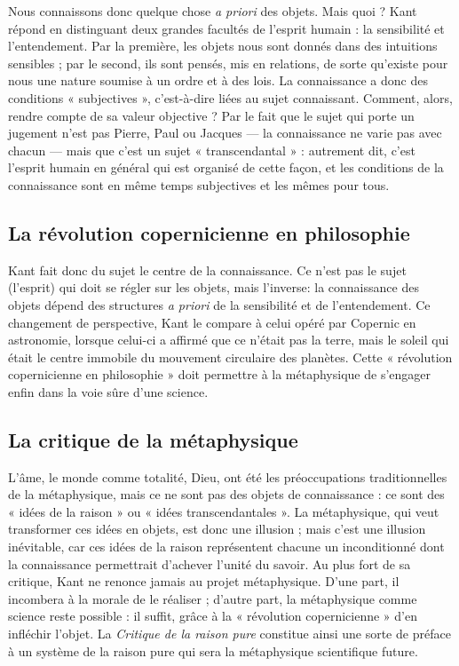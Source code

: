 Nous connaissons donc quelque chose
{\it a priori} des objets. Mais quoi ? Kant
répond en distinguant deux grandes
facultés de l'esprit humain : la sensibilité
et l’entendement. Par la première,
les objets nous sont donnés dans des
intuitions sensibles ; par le second, ils
sont pensés, mis en relations, de sorte
qu’existe pour nous une nature soumise
à un ordre et à des lois. La connaissance
a donc des conditions « subjectives »,
c'est-à-dire liées au sujet connaissant.
Comment, alors, rendre compte de sa
valeur objective ? Par le fait que le sujet
qui porte un jugement n’est pas Pierre,
Paul ou Jacques — la connaissance ne
varie pas avec chacun — mais que c’est
un sujet « transcendantal » : autrement
dit, c’est l'esprit humain en général qui
est organisé de cette façon, et les conditions
de la connaissance sont en même
temps subjectives et les mêmes pour
tous.

\subsection{La révolution copernicienne en philosophie}

Kant fait donc du sujet le centre de la
connaissance. Ce n'est pas le sujet
(l'esprit) qui doit se régler sur les objets,
mais l'inverse: la connaissance des
objets dépend des structures {\it a priori} de
la sensibilité et de l’entendement. Ce
changement de perspective, Kant le
compare à celui opéré par Copernic en
astronomie, lorsque celui-ci a affirmé
que ce n'était pas la terre, mais le soleil
qui était le centre immobile du mouvement
circulaire des planètes. Cette
« révolution copernicienne en philosophie »
doit permettre à la métaphysique
de s'engager enfin dans la voie sûre
d’une science.

\subsection{La critique de la métaphysique}

L'âme, le monde comme totalité, Dieu,
ont été les préoccupations traditionnelles
de la métaphysique, mais ce ne
sont pas des objets de connaissance : ce
sont des « idées de la raison » ou « idées
transcendantales ». La métaphysique,
qui veut transformer ces idées en objets,
est donc une illusion ; mais c’est une
illusion inévitable, car ces idées de la raison
représentent chacune un
inconditionné dont la connaissance
permettrait d'achever l'unité du savoir.
Au plus fort de sa critique, Kant ne
renonce jamais au projet métaphysique.
D'une part, il incombera à la morale de
le réaliser ; d'autre part, la métaphysique
comme science reste possible : il suffit,
grâce à la « révolution copernicienne »
d’en infléchir l'objet. La {\it Critique de la
raison pure} constitue ainsi une sorte de
préface à un système de la raison pure
qui sera la métaphysique scientifique
future.

